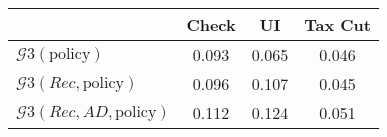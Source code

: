 \begin{tabular}{@{}lccc@{}} 
\toprule 
                          & Check      & UI    & Tax Cut    \\  \midrule 
$\mathcal{G}3(\text{policy})$ & 0.093  & 0.065  & 0.046     \\ 
$\mathcal{G}3(Rec,\text{policy})$ & 0.096  & 0.107  & 0.045     \\ 
$\mathcal{G}3(Rec, AD,\text{policy})$ & 0.112  & 0.124  & 0.051     \\ 
\end{tabular}  

